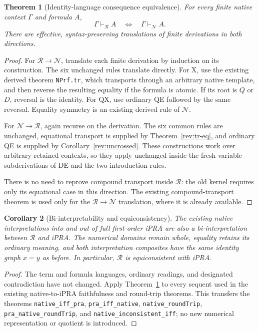 \documentclass[11pt,letterpaper]{article}
\newtheorem{theorem}{Theorem}[section]
\newtheorem{corollary}[theorem]{Corollary}
\theoremstyle{definition}\newtheorem{definition}[theorem]{Definition}
\theoremstyle{remark}\newtheorem{remark}[theorem]{Remark}
\begin{document}
\begin{theorem}[Identity-language consequence equivalence]
\label{rev:equivalence}
For every finite native context $\Gamma$ and formula $A$,
\[
                 \Gamma\vdash_{\mathcal R}A
                 \quad\Longleftrightarrow\quad
                 \Gamma\vdash_{\mathcal N}A.
\]
There are effective, syntax-preserving translations of finite
derivations in both directions.
\end{theorem}
\begin{proof}
For $\mathcal R\to\mathcal N$, translate each finite derivation by
induction on its construction. The six unchanged rules translate
directly. For X, use the existing derived theorem
\texttt{NPrf.tr}, which transports through an arbitrary native
template, and then reverse the resulting equality if the formula is
atomic. If its root is $Q$ or $D$, reversal is the identity. For QX,
use ordinary QE followed by the same reversal. Equality symmetry is an
existing derived rule of $\mathcal N$.

For $\mathcal N\to\mathcal R$, again recurse on the derivation. The
six common rules are unchanged, equational transport is supplied by
Theorem~\ref{rev:tr-eq}, and ordinary QE is supplied by
Corollary~\ref{rev:uncrossed}. These constructions work over arbitrary
retained contexts, so they apply unchanged inside the fresh-variable
subderivations of DE and the two introduction rules.

There is no need to reprove compound transport inside $\mathcal R$:
the old kernel requires only its equational case in this direction.
The existing compound-transport theorem is used only for the
$\mathcal R\to\mathcal N$ translation, where it is already available.
\end{proof}

\begin{corollary}[Bi-interpretability and equiconsistency]
\label{rev:biinterpretation}
The existing native interpretations into and out of full first-order
iPRA are also a bi-interpretation between $\mathcal R$ and iPRA.
The numerical domains remain whole, equality retains its ordinary
meaning, and both interpretation composites have the same identity
graph $x=y$ as before. In particular, $\mathcal R$ is equiconsistent
with iPRA.
\end{corollary}
\begin{proof}
The term and formula languages, ordinary readings, and designated
contradiction have not changed. Apply
Theorem~\ref{rev:equivalence} to every sequent used in the existing
native-to-iPRA faithfulness and round-trip theorems. This transfers the
theorems \texttt{native\_iff\_pra}, \texttt{pra\_iff\_native},
\texttt{native\_roundTrip}, \texttt{pra\_native\_roundTrip}, and
\texttt{native\_inconsistent\_iff}; no new numerical representation
or quotient is introduced.
\end{proof}
\end{document}
